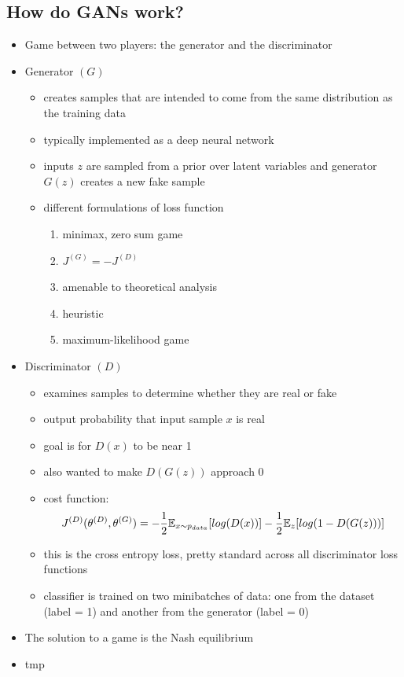 \documentclass[../main.tex]{subfiles}
\begin{document}
\subsection{How do GANs work?}
\begin{itemize}
  \item Game between two players: the generator and the discriminator
  \item Generator $(G)$
  \begin{itemize}
    \item creates samples that are intended to come from the same distribution as the training data
    \item typically implemented as a deep neural network
    \item inputs $z$ are sampled from a prior over latent variables and generator $G(z)$ creates a new fake sample
    \item different formulations of loss function
    \begin{enumerate}
      \item minimax, zero sum game
      \item $J^{(G)} = - J^{(D)}$
      \item amenable to theoretical analysis
      \item heuristic
      \item maximum-likelihood game
    \end{enumerate}

  \end{itemize}
  \item Discriminator $(D)$
  \begin{itemize}
    \item examines samples to determine whether they are real or fake
    \item output probability that input sample $x$ is real
    \item goal is for $D(x)$ to be near 1
    \item also wanted to make $D(G(z))$ approach 0
    \item cost function:
    \begin{equation*}
      J^{(D)}(\theta^{(D)}, \theta^{(G)}) = -\frac{1}{2} \mathbb{E}_{x \sim p_{data}} [log(D(x))] - \frac{1}{2} \mathbb{E}_{z} [log(1- D(G(z)))]
    \end{equation*}
    \item this is the cross entropy loss, pretty standard across all discriminator loss functions
    \item classifier is trained on two minibatches of data: one from the dataset (label = 1) and another from the generator (label = 0)
  \end{itemize}
  \item The solution to a game is the Nash equilibrium

  \item tmp
 \end{itemize}
\end{document}
